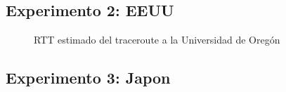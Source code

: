 \newpage
\subsection{Experimento 2: EEUU}

\begin{landscape}

\end{landscape}

\begin{figure}[H]
  \centering
  \caption{RTT estimado del traceroute a la Universidad de Oregón }
  \label{eeuuTTL}
\end{figure}


\newpage
\subsection{Experimento 3: Japon}

\begin{landscape}
  
\end{landscape}

